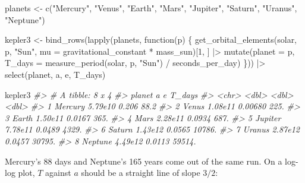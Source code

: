 \documentclass[
  10.5pt,
  letterpaper,
]{scrbook}
\newenvironment{Shaded}{\begin{snugshade}}{\end{snugshade}}
\newcommand{\AttributeTok}[1]{\textcolor[rgb]{0.00,0.00,0.00}{#1}}
\newcommand{\CommentTok}[1]{\textcolor[rgb]{0.00,0.00,0.00}{\textit{#1}}}
\newcommand{\ControlFlowTok}[1]{\textcolor[rgb]{0.00,0.00,0.00}{#1}}
\newcommand{\DecValTok}[1]{\textcolor[rgb]{0.00,0.00,0.00}{#1}}
\newcommand{\FunctionTok}[1]{\textcolor[rgb]{0.00,0.00,0.00}{#1}}
\newcommand{\NormalTok}[1]{\textcolor[rgb]{0.00,0.00,0.00}{#1}}
\newcommand{\OtherTok}[1]{\textcolor[rgb]{0.00,0.00,0.00}{#1}}
\newcommand{\SpecialCharTok}[1]{\textcolor[rgb]{0.00,0.00,0.00}{#1}}
\newcommand{\StringTok}[1]{\textcolor[rgb]{0.00,0.00,0.00}{#1}}
\theoremstyle{plain}
\theoremstyle{remark}
\begin{document}
\begin{Shaded}
\begin{Highlighting}[]
\NormalTok{planets }\OtherTok{\textless{}{-}} \FunctionTok{c}\NormalTok{(}\StringTok{"Mercury"}\NormalTok{, }\StringTok{"Venus"}\NormalTok{, }\StringTok{"Earth"}\NormalTok{, }\StringTok{"Mars"}\NormalTok{,}
             \StringTok{"Jupiter"}\NormalTok{, }\StringTok{"Saturn"}\NormalTok{, }\StringTok{"Uranus"}\NormalTok{, }\StringTok{"Neptune"}\NormalTok{)}

\NormalTok{kepler3 }\OtherTok{\textless{}{-}} \FunctionTok{bind\_rows}\NormalTok{(}\FunctionTok{lapply}\NormalTok{(planets, }\ControlFlowTok{function}\NormalTok{(p) \{}
  \FunctionTok{get\_orbital\_elements}\NormalTok{(solar, p, }\StringTok{"Sun"}\NormalTok{, }\AttributeTok{mu =}\NormalTok{ gravitational\_constant }\SpecialCharTok{*}\NormalTok{ mass\_sun)[}\DecValTok{1}\NormalTok{, ] }\SpecialCharTok{|\textgreater{}}
    \FunctionTok{mutate}\NormalTok{(}\AttributeTok{planet =}\NormalTok{ p,}
           \AttributeTok{T\_days =} \FunctionTok{measure\_period}\NormalTok{(solar, p, }\StringTok{"Sun"}\NormalTok{) }\SpecialCharTok{/}\NormalTok{ seconds\_per\_day)}
\NormalTok{\})) }\SpecialCharTok{|\textgreater{}}
  \FunctionTok{select}\NormalTok{(planet, a, e, T\_days)}

\NormalTok{kepler3}
\CommentTok{\#\textgreater{} \# A tibble: 8 x 4}
\CommentTok{\#\textgreater{}   planet        a       e  T\_days}
\CommentTok{\#\textgreater{}   \textless{}chr\textgreater{}     \textless{}dbl\textgreater{}   \textless{}dbl\textgreater{}   \textless{}dbl\textgreater{}}
\CommentTok{\#\textgreater{} 1 Mercury 5.79e10 0.206      88.2}
\CommentTok{\#\textgreater{} 2 Venus   1.08e11 0.00680   225. }
\CommentTok{\#\textgreater{} 3 Earth   1.50e11 0.0167    365. }
\CommentTok{\#\textgreater{} 4 Mars    2.28e11 0.0934    687. }
\CommentTok{\#\textgreater{} 5 Jupiter 7.78e11 0.0489   4329. }
\CommentTok{\#\textgreater{} 6 Saturn  1.43e12 0.0565  10786. }
\CommentTok{\#\textgreater{} 7 Uranus  2.87e12 0.0457  30795. }
\CommentTok{\#\textgreater{} 8 Neptune 4.49e12 0.0113  59514.}
\end{Highlighting}
\end{Shaded}

Mercury's 88 days and Neptune's 165 years come out of the same run. On a
log-log plot, \(T\) against \(a\) should be a straight line of slope
\(3/2\):
\end{document}
